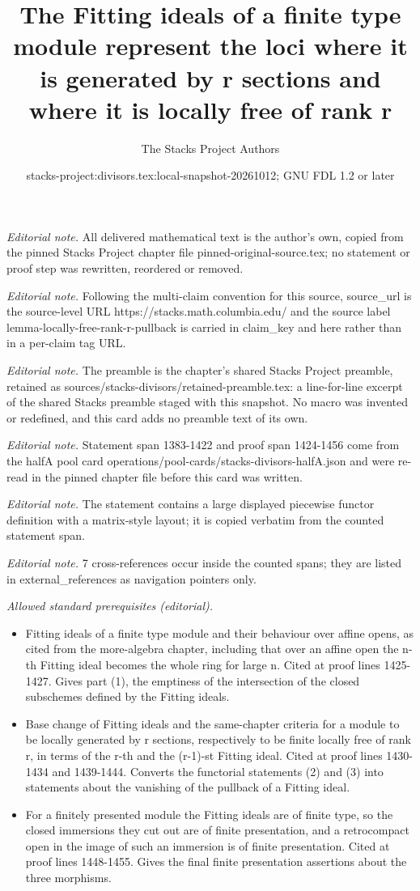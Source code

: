 \documentclass[10pt,a4paper]{amsart}
\title{The Fitting ideals of a finite type module represent the loci where it is generated by r sections and where it is locally free of rank r}
\author{The Stacks Project Authors}
\date{stacks-project:divisors.tex:local-snapshot-20261012; GNU FDL 1.2 or later}
\theoremstyle{plain}
\theoremstyle{definition}
\theoremstyle{remark}
\numberwithin{equation}{subsection}
\begin{document}
\maketitle
\noindent\textit{Editorial note.} All delivered mathematical text is the author's own, copied from the pinned Stacks Project chapter file pinned-original-source.tex; no statement or proof step was rewritten, reordered or removed.\par\medskip
\noindent\textit{Editorial note.} Following the multi-claim convention for this source, source\_url is the source-level URL https://stacks.math.columbia.edu/ and the source label lemma-locally-free-rank-r-pullback is carried in claim\_key and here rather than in a per-claim tag URL.\par\medskip
\noindent\textit{Editorial note.} The preamble is the chapter's shared Stacks Project preamble, retained as sources/stacks-divisors/retained-preamble.tex: a line-for-line excerpt of the shared Stacks preamble staged with this snapshot. No macro was invented or redefined, and this card adds no preamble text of its own.\par\medskip
\noindent\textit{Editorial note.} Statement span 1383-1422 and proof span 1424-1456 come from the halfA pool card operations/pool-cards/stacks-divisors-halfA.json and were re-read in the pinned chapter file before this card was written.\par\medskip
\noindent\textit{Editorial note.} The statement contains a large displayed piecewise functor definition with a matrix-style layout; it is copied verbatim from the counted statement span.\par\medskip
\noindent\textit{Editorial note.} 7 cross-references occur inside the counted spans; they are listed in external\_references as navigation pointers only.\par\medskip
\noindent\textit{Allowed standard prerequisites (editorial).}\begin{itemize}
\item Fitting ideals of a finite type module and their behaviour over affine opens, as cited from the more-algebra chapter, including that over an affine open the n-th Fitting ideal becomes the whole ring for large n. Cited at proof lines 1425-1427. Gives part (1), the emptiness of the intersection of the closed subschemes defined by the Fitting ideals.
\item Base change of Fitting ideals and the same-chapter criteria for a module to be locally generated by r sections, respectively to be finite locally free of rank r, in terms of the r-th and the (r-1)-st Fitting ideal. Cited at proof lines 1430-1434 and 1439-1444. Converts the functorial statements (2) and (3) into statements about the vanishing of the pullback of a Fitting ideal.
\item For a finitely presented module the Fitting ideals are of finite type, so the closed immersions they cut out are of finite presentation, and a retrocompact open in the image of such an immersion is of finite presentation. Cited at proof lines 1448-1455. Gives the final finite presentation assertions about the three morphisms.
\end{itemize}\medskip
\end{document}
